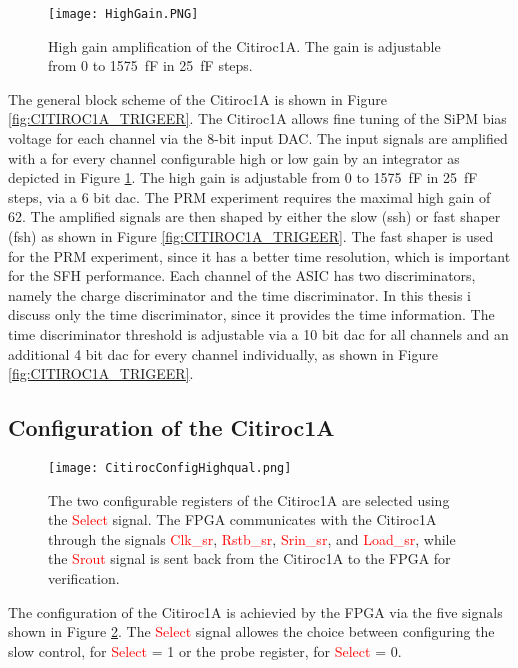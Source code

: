\begin{figure}[h]
    \centering
    \texttt{[image: HighGain.PNG]}
    \caption{High gain amplification of the Citiroc1A. The gain is adjustable from 0 to \SI{1575}{\femto\farad} in \SI{25}{\femto\farad} steps.\autocite{datasheetCITIROC}}
    \label{HighGain}
\end{figure}
The general block scheme of the Citiroc1A is shown in Figure \ref{fig:CITIROC1A_TRIGEER}.
\newline
The Citiroc1A allows fine tuning of the SiPM bias voltage for each channel via the 8-bit input DAC.
\newline	
The input signals are amplified with a for every channel configurable high or low gain by an integrator as depicted in Figure \ref{HighGain}.
The high gain is adjustable from 0 to \SI{1575}{\femto\farad} in \SI{25}{\femto\farad} steps, via a 6 bit dac.\autocite{datasheetCITIROC}
The PRM experiment requires the maximal high gain of 62.\autocite{InternalcommunicationIgor}
\newline
The amplified signals are then shaped by either the slow (ssh) or fast shaper (fsh) as shown in Figure \ref{fig:CITIROC1A_TRIGEER}. 
The fast shaper is used for the PRM experiment, since it has a better time resolution, which is important for the SFH performance.\autocite{datasheetCITIROC}
\newline
Each channel of the ASIC has two discriminators, namely the charge discriminator and the time discriminator. In this thesis i discuss only the time discriminator,
since it provides the time information.
The time discriminator threshold is adjustable via a 10 bit dac for all channels and an additional 4 bit dac for every channel individually, as shown in Figure \ref{fig:CITIROC1A_TRIGEER}\autocite{datasheetCITIROC}.

\subsection{Configuration of the Citiroc1A}\label{sec:configuration}
\begin{figure}[h]
    \centering
    \texttt{[image: CitirocConfigHighqual.png]}
    \caption{The two configurable registers of the Citiroc1A are selected using the \textcolor{red}{Select} signal. 
    The FPGA communicates with the Citiroc1A through the signals \textcolor{red}{Clk\_sr}, \textcolor{red}{Rstb\_sr}, 
    \textcolor{red}{Srin\_sr}, and \textcolor{red}{Load\_sr}, while the \textcolor{red}{Srout} signal is sent back from the Citiroc1A to the FPGA for verification.\autocite{datasheetCITIROC}}
    \label{fig:CITIROC1A_config}
\end{figure}
The configuration of the Citiroc1A is achievied by the FPGA via the five signals shown in Figure \ref{fig:CITIROC1A_config}.
The \textcolor{red}{Select} signal allowes the choice between configuring the slow control, for \textcolor{red}{Select} = 1  or the probe register, for \textcolor{red}{Select} = 0.\autocite{datasheetCITIROC}

